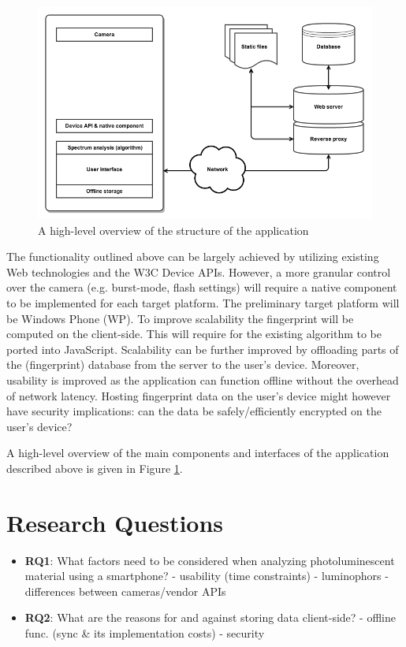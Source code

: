 \documentclass[thesis.tex]{subfiles}
\begin{document}
\begin{figure}[hb]
\centering \includegraphics[width=13.25cm]{images/diagram_0404}
\caption{A high-level overview of the structure of the application \label{fig:diagram}}
\end{figure}

The functionality outlined above can be largely achieved by utilizing existing Web technologies and the W3C Device APIs. However, a more granular control over the camera (e.g. burst-mode, flash settings) will require a native component to be implemented for each target platform. The preliminary target platform will be Windows Phone (WP). To improve scalability the fingerprint will be computed on the client-side. This will require for the existing algorithm to be ported into JavaScript. Scalability can be further improved by offloading parts of the (fingerprint) database from the server to the user's device. Moreover, usability is improved as the application can function offline without the overhead of network latency. Hosting fingerprint data on the user's device might however have security implications: can the data be safely/efficiently encrypted on the user's device?

A high-level overview of the main components and interfaces of the application described above is given in Figure \ref{fig:diagram}.

\section{Research Questions}


\begin{itemize}
	\item \textbf{RQ1}: What factors need to be considered when analyzing photoluminescent material using a smartphone?
	- usability (time constraints)
	- luminophors
	- differences between cameras/vendor APIs
	\item \textbf{RQ2}: What are the reasons for and against storing data client-side?
	- offline func. (sync \& its implementation costs)
	- security
\end{itemize}
\end{document}
